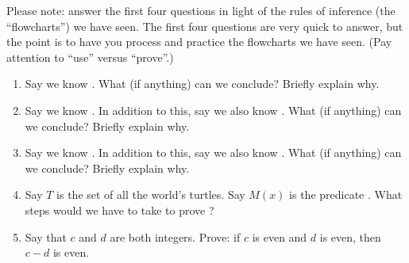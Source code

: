 \documentclass{article}
\begin{document}
Please note: answer the first four questions in light of the rules of inference (the ``flowcharts'') we have seen. The first four questions are very quick to answer, but the point is to have you process and practice the flowcharts we have seen. (Pay attention to ``use'' versus ``prove''.)

\begin{enumerate}

\item Say we know . What (if anything) can we conclude? Briefly explain why.



\newpage

\item Say we know . In addition to this, say we also know . What (if anything) can we conclude? Briefly explain why.



\newpage

\item Say we know .  In addition to this, say we also know . What (if anything) can we conclude? Briefly explain why.



\newpage

\item Say $T$ is the set of all the world's turtles. Say $M(x)$ is the predicate . What steps would we have to take to prove ?



\newpage

\item Say that $c$ and $d$ are both integers. Prove: if $c$ is even and $d$ is even, then $c-d$ is even.

\end{enumerate}
\end{document}
